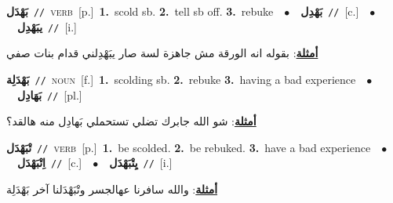 \documentclass[10pt,a4paper,twoside]{article} %
\begin{document}
\begin{multicols}{2}
{\setlength\topsep{0pt}\textbf{\foreignlanguage{arabic}{بَهْدَل}}\ {\color{gray}\texttt{//}\color{black}}\ \textsc{verb}\ [p.]\ \textbf{1.}~scold sb.  \textbf{2.}~tell sb off.  \textbf{3.}~rebuke\ \ $\bullet$\ \ \setlength\topsep{0pt}\textbf{\foreignlanguage{arabic}{بَهْدِل}}\ {\color{gray}\texttt{//}\color{black}}\ [c.]\ \ $\bullet$\ \ \setlength\topsep{0pt}\textbf{\foreignlanguage{arabic}{يبَهْدِل}}\ {\color{gray}\texttt{//}\color{black}}\ [i.]\  \begin{flushright}\color{gray}\foreignlanguage{arabic}{\textbf{\underline{\foreignlanguage{arabic}{أمثلة}}}: بقوله انه الورقة مش جاهزة لسة صار يبَهْدِلني قدام بنات صفي}\end{flushright}\color{black}} \vspace{2mm}

{\setlength\topsep{0pt}\textbf{\foreignlanguage{arabic}{بَهْدَلِة}}\ {\color{gray}\texttt{//}\color{black}}\ \textsc{noun}\ [f.]\ \textbf{1.}~scolding sb.  \textbf{2.}~rebuke  \textbf{3.}~having a bad experience\ \ $\bullet$\ \ \setlength\topsep{0pt}\textbf{\foreignlanguage{arabic}{بَهَادِل}}\ {\color{gray}\texttt{//}\color{black}}\ [pl.]\  \begin{flushright}\color{gray}\foreignlanguage{arabic}{\textbf{\underline{\foreignlanguage{arabic}{أمثلة}}}: شو الله جابرك تضلي تستحملي بَهادِل منه هالقد؟}\end{flushright}\color{black}} \vspace{2mm}

{\setlength\topsep{0pt}\textbf{\foreignlanguage{arabic}{تْبَهْدَل}}\ {\color{gray}\texttt{//}\color{black}}\ \textsc{verb}\ [p.]\ \textbf{1.}~be scolded.  \textbf{2.}~be rebuked.  \textbf{3.}~have a bad experience\ \ $\bullet$\ \ \setlength\topsep{0pt}\textbf{\foreignlanguage{arabic}{اِتْبَهْدَل}}\ {\color{gray}\texttt{//}\color{black}}\ [c.]\ \ $\bullet$\ \ \setlength\topsep{0pt}\textbf{\foreignlanguage{arabic}{يِتْبَهْدَل}}\ {\color{gray}\texttt{//}\color{black}}\ [i.]\  \begin{flushright}\color{gray}\foreignlanguage{arabic}{\textbf{\underline{\foreignlanguage{arabic}{أمثلة}}}: والله سافرنا عهالجسر وتْبَهْدَلنا آخر بَهْدَلِة}\end{flushright}\color{black}} \vspace{2mm}


\end{multicols}
\end{document}
